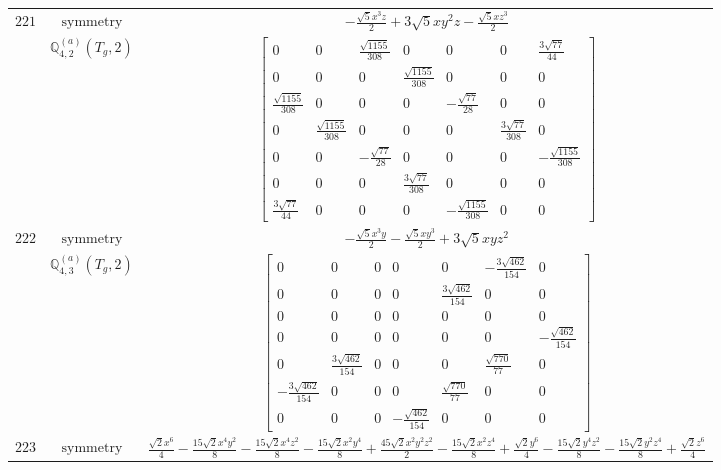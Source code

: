 \documentclass[fleqn,8pt,landscape]{jsarticle}
\begin{document}
\begin{longtable}{ccc}
$ 221 $ & $ \text{symmetry} $ & $ - \frac{\sqrt{5} x^{3} z}{2} + 3 \sqrt{5} x y^{2} z - \frac{\sqrt{5} x z^{3}}{2} $ \\
$  $ & $ \mathbb{Q}_{4,2}^{(a)}(T_{g},2) $ & $ \begin{bmatrix} 0 & 0 & \frac{\sqrt{1155}}{308} & 0 & 0 & 0 & \frac{3 \sqrt{77}}{44} \\ 0 & 0 & 0 & \frac{\sqrt{1155}}{308} & 0 & 0 & 0 \\ \frac{\sqrt{1155}}{308} & 0 & 0 & 0 & - \frac{\sqrt{77}}{28} & 0 & 0 \\ 0 & \frac{\sqrt{1155}}{308} & 0 & 0 & 0 & \frac{3 \sqrt{77}}{308} & 0 \\ 0 & 0 & - \frac{\sqrt{77}}{28} & 0 & 0 & 0 & - \frac{\sqrt{1155}}{308} \\ 0 & 0 & 0 & \frac{3 \sqrt{77}}{308} & 0 & 0 & 0 \\ \frac{3 \sqrt{77}}{44} & 0 & 0 & 0 & - \frac{\sqrt{1155}}{308} & 0 & 0 \end{bmatrix} $ \\ \hline
$ 222 $ & $ \text{symmetry} $ & $ - \frac{\sqrt{5} x^{3} y}{2} - \frac{\sqrt{5} x y^{3}}{2} + 3 \sqrt{5} x y z^{2} $ \\
$  $ & $ \mathbb{Q}_{4,3}^{(a)}(T_{g},2) $ & $ \begin{bmatrix} 0 & 0 & 0 & 0 & 0 & - \frac{3 \sqrt{462}}{154} & 0 \\ 0 & 0 & 0 & 0 & \frac{3 \sqrt{462}}{154} & 0 & 0 \\ 0 & 0 & 0 & 0 & 0 & 0 & 0 \\ 0 & 0 & 0 & 0 & 0 & 0 & - \frac{\sqrt{462}}{154} \\ 0 & \frac{3 \sqrt{462}}{154} & 0 & 0 & 0 & \frac{\sqrt{770}}{77} & 0 \\ - \frac{3 \sqrt{462}}{154} & 0 & 0 & 0 & \frac{\sqrt{770}}{77} & 0 & 0 \\ 0 & 0 & 0 & - \frac{\sqrt{462}}{154} & 0 & 0 & 0 \end{bmatrix} $ \\ \hline
$ 223 $ & $ \text{symmetry} $ & $ \frac{\sqrt{2} x^{6}}{4} - \frac{15 \sqrt{2} x^{4} y^{2}}{8} - \frac{15 \sqrt{2} x^{4} z^{2}}{8} - \frac{15 \sqrt{2} x^{2} y^{4}}{8} + \frac{45 \sqrt{2} x^{2} y^{2} z^{2}}{2} - \frac{15 \sqrt{2} x^{2} z^{4}}{8} + \frac{\sqrt{2} y^{6}}{4} - \frac{15 \sqrt{2} y^{4} z^{2}}{8} - \frac{15 \sqrt{2} y^{2} z^{4}}{8} + \frac{\sqrt{2} z^{6}}{4} $ \\

\end{longtable}
\end{document}
